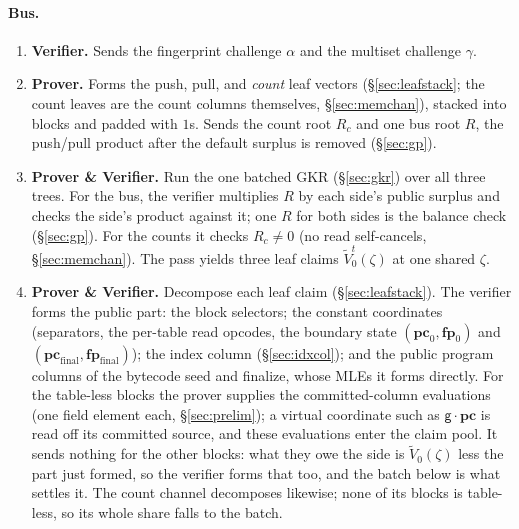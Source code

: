 \documentclass[11pt]{article}
\newcommand{\gen}{\mathsf{g}}
\newcommand{\pc}{\mathbf{pc}}
\newcommand{\fp}{\mathbf{fp}}
\begin{document}
\paragraph{Bus.}
\begin{enumerate}
\item \textbf{Verifier.} Sends the fingerprint challenge $\alpha$ and the multiset challenge $\gamma$.
\item \textbf{Prover.} Forms the push, pull, and \emph{count} leaf vectors (\S\ref{sec:leafstack}; the count leaves are the count columns themselves, \S\ref{sec:memchan}), stacked into blocks and padded with $1$s. Sends the count root $R_c$ and one bus root $R$, the push/pull product after the default surplus is removed (\S\ref{sec:gp}).
\item \textbf{Prover \& Verifier.} Run the one batched GKR (\S\ref{sec:gkr}) over all three trees. For the bus, the verifier multiplies $R$ by each side's public surplus and checks the side's product against it; one $R$ for both sides is the balance check (\S\ref{sec:gp}). For the counts it checks $R_c\neq0$ (no read self-cancels, \S\ref{sec:memchan}). The pass yields three leaf claims $\widetilde V^{t}_0(\zeta)$ at one shared $\zeta$.
\item \textbf{Prover \& Verifier.} Decompose each leaf claim (\S\ref{sec:leafstack}). The verifier forms the public part: the block selectors; the constant coordinates (separators, the per-table read opcodes, the boundary state $(\pc_0,\fp_0)$ and $(\pc_{\mathrm{final}},\fp_{\mathrm{final}})$); the index column (\S\ref{sec:idxcol}); and the public program columns of the bytecode seed and finalize, whose MLEs it forms directly. For the table-less blocks the prover supplies the committed-column evaluations (one field element each, \S\ref{sec:prelim}); a virtual coordinate such as $\gen\cdot\pc$ is read off its committed source, and these evaluations enter the claim pool. It sends nothing for the other blocks: what they owe the side is $\widetilde V_0(\zeta)$ less the part just formed, so the verifier forms that too, and the batch below is what settles it. The count channel decomposes likewise; none of its blocks is table-less, so its whole share falls to the batch.
\end{enumerate}
\end{document}
